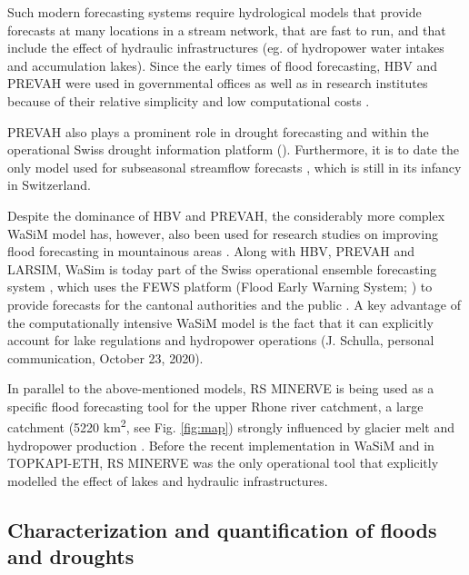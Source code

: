\documentclass[10pt,a4paper]{article}
\begin{document}
Such modern forecasting systems require hydrological models that provide
forecasts at many locations in a stream network, that are fast to run,
and that include the effect of hydraulic infrastructures (eg. of
hydropower water intakes and accumulation lakes). Since the early times
of flood forecasting, HBV and PREVAH were used in governmental offices
\citep{Karsten2016} as well as in research institutes because of their
relative simplicity and low computational costs \citep{Verbunt2006,Addor_2011,Murphy_2019,Antonetti2019}.

PREVAH also plays a prominent role in drought
forecasting \citep{Fundel2013,J_rg_Hess_2015,Bogner2018b} and within the operational Swiss drought
information platform (\citealp{Stahli2013}). Furthermore, it is to date
the only model used for subseasonal streamflow
forecasts \citep{Monhart_2019,Anghileri2019}, which is still in its infancy in
Switzerland.

Despite the dominance of HBV and PREVAH, the considerably more complex
WaSiM model has, however, also been used for research studies on
improving flood forecasting in mountainous areas \citep{Jasper2003,Ahrens2003b,Jasper2002}.
Along with HBV, PREVAH and LARSIM, WaSim is today part of the Swiss
operational ensemble forecasting system \citep{Karsten2016}, which uses
the FEWS platform (Flood Early Warning System; \citealp{Werner_2013}) to
provide forecasts for the cantonal authorities and the
public \citep{FOEN2019}. A key advantage of the computationally
intensive WaSiM model is the fact that it can explicitly account for
lake regulations and hydropower operations (J. Schulla, personal
communication, October 23, 2020). 

In parallel to the above-mentioned models, RS MINERVE is being used as a
specific flood forecasting tool for the upper Rhone river catchment, a
large catchment (5220 km\textsuperscript{2}, see
Fig. \ref{fig:map}) strongly influenced by glacier
melt and hydropower production \citep{GarciaHernandez2009b,GarciaHernandez2009,Jordan2010}. 
Before the recent implementation in WaSiM and in TOPKAPI-ETH, RS MINERVE was the only
operational tool that explicitly modelled the effect of lakes and
hydraulic infrastructures.

\subsection{Characterization and quantification of floods and droughts}
\label{sec:application:floodsdroughts}
\end{document}
